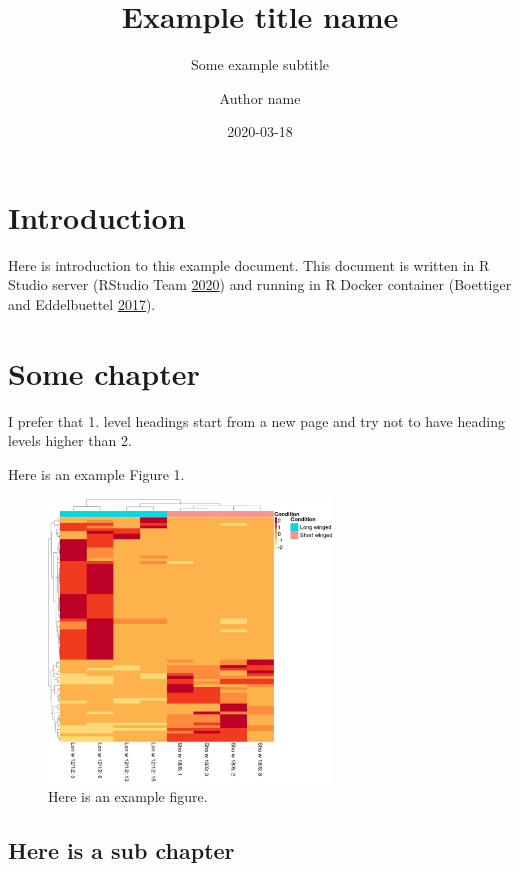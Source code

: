 \documentclass[
]{article}
\title{Example title name}
\subtitle{Some example subtitle}
\author{Author name}
\date{2020-03-18}
\begin{document}
\maketitle

{
\hypersetup{linkcolor=NavyBlue}
\setcounter{tocdepth}{2}
\tableofcontents
}
\clearpage

\hypertarget{introduction}{%
\section{Introduction}\label{introduction}}

Here is introduction to this example document. This document is written in R Studio server (RStudio Team \protect\hyperlink{ref-RStudioTeam2020}{2020}) and running in R Docker container (Boettiger and Eddelbuettel \protect\hyperlink{ref-Boettiger2017}{2017}).

\clearpage

\hypertarget{some-chapter}{%
\section{Some chapter}\label{some-chapter}}

I prefer that 1. level headings start from a new page and try not to have heading levels higher than 2.

Here is an example Figure 1.

\begin{figure}
\centering
\includegraphics[width=0.67\textwidth,height=\textheight]{../presentations/images/example.jpg}
\caption{Here is an example figure.}
\end{figure}

\hypertarget{here-is-a-sub-chapter}{%
\subsection{Here is a sub chapter}\label{here-is-a-sub-chapter}}
\end{document}
